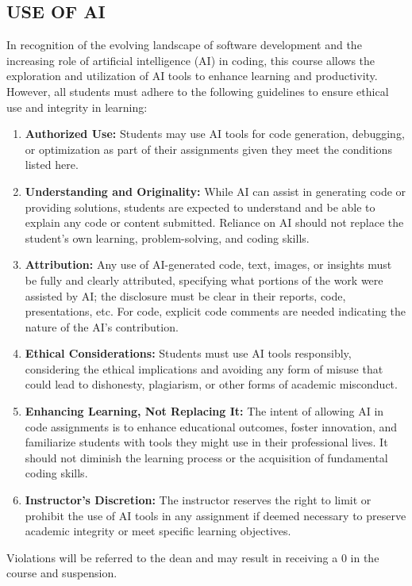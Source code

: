 \documentclass [11pt]{article}
\begin{document}
\subsection*{USE OF AI}
In recognition of the evolving landscape of software development and the increasing role of artificial intelligence (AI) in coding, this course allows the exploration and utilization of AI tools to enhance learning and productivity. However, all students must adhere to the following guidelines to ensure ethical use and integrity in learning:

\begin{enumerate}
    \item \textbf{Authorized Use:} Students may use AI tools for code generation, debugging, or optimization as part of their assignments given they meet the conditions listed here. 
    \item \textbf{Understanding and Originality:} While AI can assist in generating code or providing solutions, students are expected to understand and be able to explain any code or content submitted. Reliance on AI should not replace the student's own learning, problem-solving, and coding skills.
    \item \textbf{Attribution:} Any use of AI-generated code, text, images, or insights must be fully and clearly attributed, specifying what portions of the work were assisted by AI; the disclosure must be clear in their reports, code, presentations, etc. For code, explicit code comments are needed indicating the nature of the AI's contribution.
    \item \textbf{Ethical Considerations:} Students must use AI tools responsibly, considering the ethical implications and avoiding any form of misuse that could lead to dishonesty, plagiarism, or other forms of academic misconduct.
    \item \textbf{Enhancing Learning, Not Replacing It:} The intent of allowing AI in code assignments is to enhance educational outcomes, foster innovation, and familiarize students with tools they might use in their professional lives. It should not diminish the learning process or the acquisition of fundamental coding skills.
    \item \textbf{Instructor's Discretion:} The instructor reserves the right to limit or prohibit the use of AI tools in any assignment if deemed necessary to preserve academic integrity or meet specific learning objectives.
\end{enumerate}

Violations will be referred to the dean and may result in receiving a 0 in the course and suspension.
\end{document}
